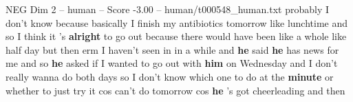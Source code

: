 \begin{textsample}{NEG Dim 2 – human – Score -3.00 – human/t000548\_human.txt}  \label{ex:f2_neg_006}
probably I don't know because basically I finish my antibiotics tomorrow like lunchtime and so I think it 's \textbf{alright} to go out because there would have been like a whole like half day but then erm I haven't seen in in a while and \textbf{he} said \textbf{he} has news for me and so \textbf{he} asked if I wanted to go out with \textbf{him} on Wednesday and I don't really wanna do both days so I don't know which one to do at the \textbf{minute} or whether to just try it cos can't do tomorrow cos \textbf{he} 's got cheerleading and then

\end{textsample}
